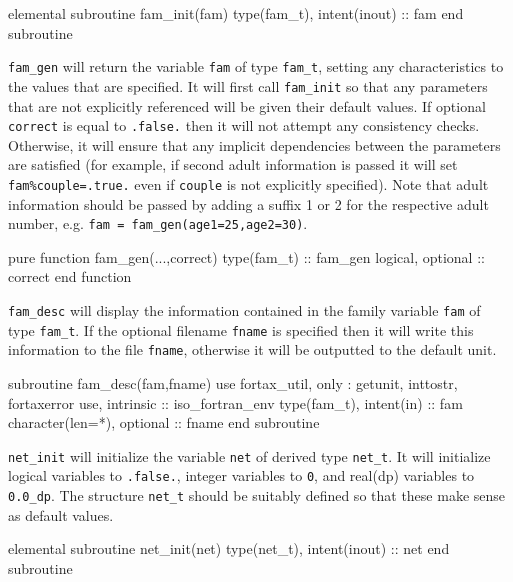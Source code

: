 \documentclass[11pt,thmsa,letter,ukenglish]{article}
\begin{document}
\begin{fortrancode}
elemental subroutine fam_init(fam)
    type(fam_t), intent(inout) :: fam
end subroutine
\end{fortrancode}

\noindent\texttt{fam\_gen} will return the variable \texttt{fam} of type \texttt{fam\_t}, setting any characteristics to the values that are specified. It will first call \texttt{fam\_init} so that any parameters that are not explicitly referenced will be given their default values. If optional \texttt{correct} is equal to \texttt{.false.} then it will not attempt any consistency checks. Otherwise, it will ensure that any implicit dependencies between the parameters are satisfied (for example, if second adult information is passed it will set \texttt{fam\%couple=.true.} even if \texttt{couple} is not explicitly specified). Note that adult information should be passed by adding a suffix 1 or 2 for the respective adult number, e.g. \texttt{fam = fam\_gen(age1=25,age2=30)}.

\begin{fortrancode}
pure function fam_gen(...,correct)
    type(fam_t)       :: fam_gen
    logical, optional :: correct
end function
\end{fortrancode}

\noindent\texttt{fam\_desc} will display the information contained in the family variable \texttt{fam} of type \texttt{fam\_t}. If the optional filename \texttt{fname} is specified then it will write this information to the file \texttt{fname}, otherwise it will be outputted to the default unit.

\begin{fortrancode}
subroutine fam_desc(fam,fname)
    use fortax_util, only : getunit, inttostr, fortaxerror
    use, intrinsic :: iso_fortran_env
    type(fam_t), intent(in)    :: fam
    character(len=*), optional :: fname
end subroutine
\end{fortrancode}
    
\noindent\texttt{net\_init} will initialize the variable \texttt{net} of derived type \texttt{net\_t}. It will initialize logical variables to \texttt{.false.}, integer variables to \texttt{0}, and real(dp) variables to \texttt{0.0\_dp}. The structure \texttt{net\_t} should be suitably defined so that these make sense as default values.

\begin{fortrancode}
elemental subroutine net_init(net)
    type(net_t), intent(inout) :: net
end subroutine
\end{fortrancode}
\end{document}
